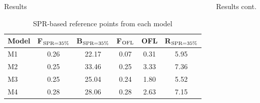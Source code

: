 \documentclass[final]{beamer} %
\newcommand{\fspr}{F$_{\rm{SPR=35\%}}$}
\newcommand{\bspr}{B$_{\rm{SPR=35\%}}$}
\newcommand{\rspr}{R$_{\rm{SPR=35\%}}$}
\newcommand{\fofl}{F$_{\rm{OFL}}$}
\begin{document}
\begin{frame}{}
\begin{columns}[t]
\begin{column}{.3\linewidth}
\begin{block}{\large Results}
          \begin{table}
          \centering
          \caption{SPR-based reference points from each model}
          \begin{tabular}{@{} p{.2\linewidth} c c c c c @{}}
            \toprule
            Model & \fspr &  \bspr & \fofl &  OFL & \rspr \\
            \midrule
            \addlinespace
               \textcolor{cM1}{M1} & 0.26  &  22.17 & 0.07  & 0.31  & 5.95 \\
               \textcolor{cM2}{M2} & 0.25  &  33.46 & 0.25  & 3.33  & 7.36 \\
               \textcolor{cM3}{M3} & 0.25  &  25.04 & 0.24  & 1.80  & 5.52 \\
               \textcolor{cM4}{M4} & 0.28  &  28.06 & 0.28  & 2.63  & 7.15 \\
            \bottomrule
          \end{tabular}
          \label{tab:spr_results}
          \end{table} 
        \end{block}

      \end{column}







      \begin{column}{.3\linewidth}
        \vspace{6.5in}
        \begin{block}{\large Results cont.}
          \centering
          
          


\end{block}
\end{column}
\end{columns}
\end{frame}
\end{document}
